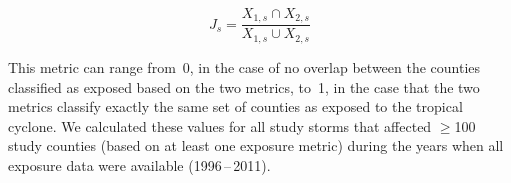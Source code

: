 \begin{equation} 
J_s = \frac{X_{1,s} \cap X_{2,s}}{X_{1,s} \cup X_{2,s}}
\end{equation}

\noindent This metric can range from~0, in the case of no overlap between the
counties classified as exposed based on the two metrics, to~1, in the case that
the two metrics classify exactly the same set of counties as exposed to the
tropical cyclone. We calculated these values for all study storms that affected
$\ge$100 study counties (based on at least one exposure metric) during the
years when all exposure data were available (1996\,--\,2011).



